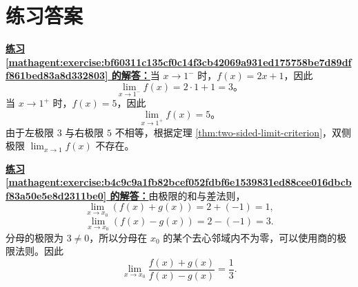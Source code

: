 \documentclass[UTF8,fontset=fandol,11pt]{ctexart}
\begin{document}
\section*{练习答案}
\par\noindent\textbf{\hyperref[mathagent:exercise:bf60311c135cf0c14f3cb42069a931ed175758be7d89dff861bed83a8d332803]{练习 \ref*{mathagent:exercise:bf60311c135cf0c14f3cb42069a931ed175758be7d89dff861bed83a8d332803} 的解答：}}当 $x\to1^-$ 时，$f(x)=2x+1$，因此
\[
\lim_{x\to1^-}f(x)=2\cdot1+1=3\text{。}
\]
当 $x\to1^+$ 时，$f(x)=5$，因此
\[
\lim_{x\to1^+}f(x)=5\text{。}
\]
由于左极限 $3$ 与右极限 $5$ 不相等，根据定理 \ref{thm:two-sided-limit-criterion}，双侧极限 $\lim_{x\to1}f(x)$ 不存在。\par
\par\noindent\textbf{\hyperref[mathagent:exercise:b4c9c9a1fb82bcef052fdbf6e1539831ed88cee016dbcbf83a50e5e8d2311be0]{练习 \ref*{mathagent:exercise:b4c9c9a1fb82bcef052fdbf6e1539831ed88cee016dbcbf83a50e5e8d2311be0} 的解答：}}由极限的和与差法则，
\[
\lim_{x\to x_0}(f(x)+g(x))=2+(-1)=1,
\]
\[
\lim_{x\to x_0}(f(x)-g(x))=2-(-1)=3.
\]
分母的极限为 $3\neq0$，所以分母在 $x_0$ 的某个去心邻域内不为零，可以使用商的极限法则。因此
\[
\lim_{x\to x_0}\frac{f(x)+g(x)}{f(x)-g(x)}=\frac{1}{3}.
\]\par
\end{document}
